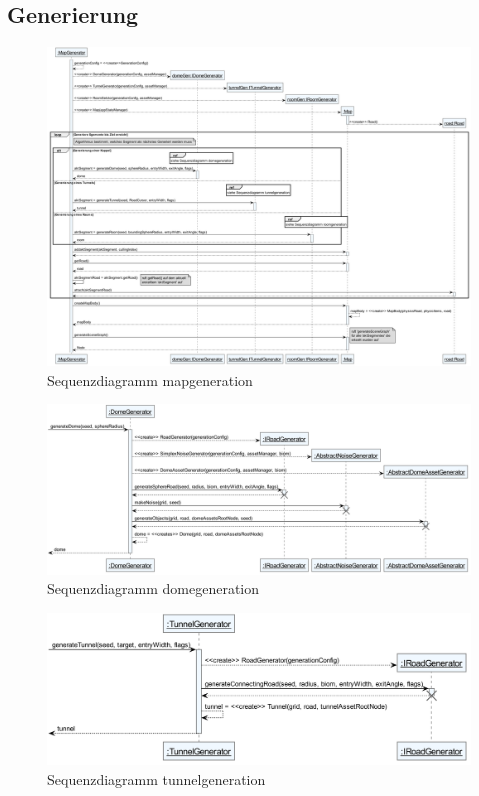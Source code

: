 \subsection{Generierung}

\begin{figure} [htbp]
    \centering
    \centering
    \includegraphics[width=\linewidth]{./Generierung/Bilder/mapgenerationSequenz.png}
    \caption{Sequenzdiagramm mapgeneration}
\end{figure}

\begin{figure} [htbp]
    \centering
    \centering
    \includegraphics[width=\linewidth]{./Generierung/Bilder/domeGenerationSequenz.png}
    \caption{Sequenzdiagramm domegeneration}
\end{figure}

\begin{figure} [htbp]
    \centering
    \centering
    \includegraphics[width=\linewidth]{./Generierung/Bilder/tunnelGenerationSequenz.png}
    \caption{Sequenzdiagramm tunnelgeneration}
\end{figure}

